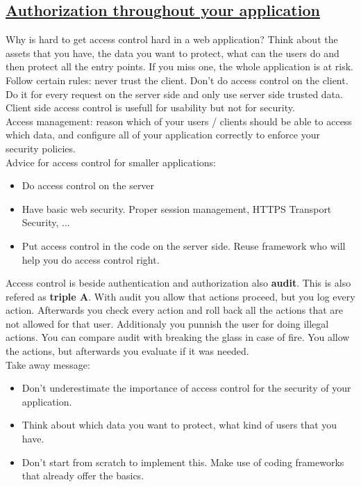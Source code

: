 \documentclass[titlepage]{article}
\begin{document}
    \subsection{\href{https://youtu.be/rTh_O6KHVSY}{Authorization throughout your application}}
    Why is hard to get access control hard in a web application? Think about the assets that you have, the data you want to protect, what can the users do and then protect all the entry points. If you miss one, the whole application is at risk.\\
    Follow certain rules: never trust the client. Don't do access control on the client. Do it for every request on the server side and only use server side trusted data. Client side access control is usefull for usability but not for security.\\
    Access management: reason which of your users / clients should be able to access which data, and configure all of your application correctly to enforce your security policies.\\
    Advice for access control for smaller applications:
    \begin{itemize}
        \item Do access control on the server
        \item Have basic web security. Proper session management, HTTPS Transport Security, ...
        \item Put access control in the code on the server side. Reuse framework who will help you do access control right.
    \end{itemize}
    Access control is beside authentication and authorization also \textbf{audit}. This is also refered as \textbf{triple A}. With audit you allow that actions proceed, but you log every action. Afterwards you check every action and roll back all the actions that are not allowed for that user. Additionaly you punnish the user for doing illegal actions. You can compare audit with breaking the glass in case of fire. You allow the actions, but afterwards you evaluate if it was needed.\\
    Take away message: 
    \begin{itemize}
        \item Don't underestimate the importance of access control for the security of your application.
        \item Think about which data you want to protect, what kind of users that you have.
        \item Don't start from scratch to implement this. Make use of coding frameworks that already offer the basics.
    \end{itemize}
\end{document}
